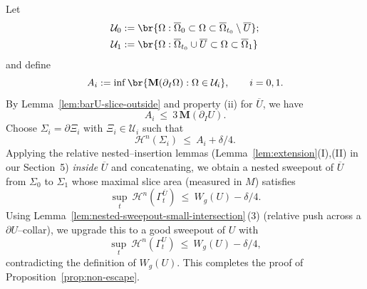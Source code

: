 Let 
\begin{equation*}
    \begin{split}
        &\mathcal{U}_0:=\br{\Omega: \overline{\Omega}_0\subset \Omega\subset \overline{\Omega}_{t_0}\setminus \overline{U}};\\
        &\mathcal{U}_1:=\br{\Omega: \overline{\Omega}_{t_0}\cup \overline{U}\subset \Omega\subset \overline{\Omega}_1}
    \end{split}
\end{equation*}
and define
\begin{equation*}
  A_i:=\inf\br{\mathbf{M}(\partial_I\Omega) : \Omega\in\mathcal{U}_i},\qquad i=0,1.
\end{equation*}
By Lemma~\ref{lem:barU-slice-outside} and property (ii) for $\overline U$, we have 
\begin{equation*}
  A_i\ \le\ 3\,\mathbf{M}(\partial_IU).
\end{equation*}
Choose $\Sigma_i=\partial\Xi_i$ with $\Xi_i\in\mathcal U_i$ such that 
\begin{equation*}
  \mathcal{H}^n(\Sigma_i)\ \le\ A_i+\delta/4.
\end{equation*}
Applying the relative nested–insertion lemmas (Lemma~\ref{lem:extension}(I),(II) in our Section~5) \emph{inside} $\overline U$ and concatenating,
we obtain a nested sweepout of $\overline U$ from $\Sigma_0$ to $\Sigma_1$ whose maximal slice area (measured in $M$) satisfies
\begin{equation*}
  \sup_{t}\ \mathcal{H}^n(\Gamma^{\overline U}_t)\ \le\ W_g(U)-\delta/4.
\end{equation*}
Using Lemma~\ref{lem:nested-sweepout-small-intersection}\,(3) (relative push across a $\partial U$–collar),
we upgrade this to a good sweepout of $U$ with
\begin{equation*}
  \sup_{t}\ \mathcal{H}^n(\Gamma^{U}_t)\ \le\ W_g(U)-\delta/4,
\end{equation*}
contradicting the definition of $W_g(U)$. This completes the proof of Proposition~\ref{prop:non-escape}.
